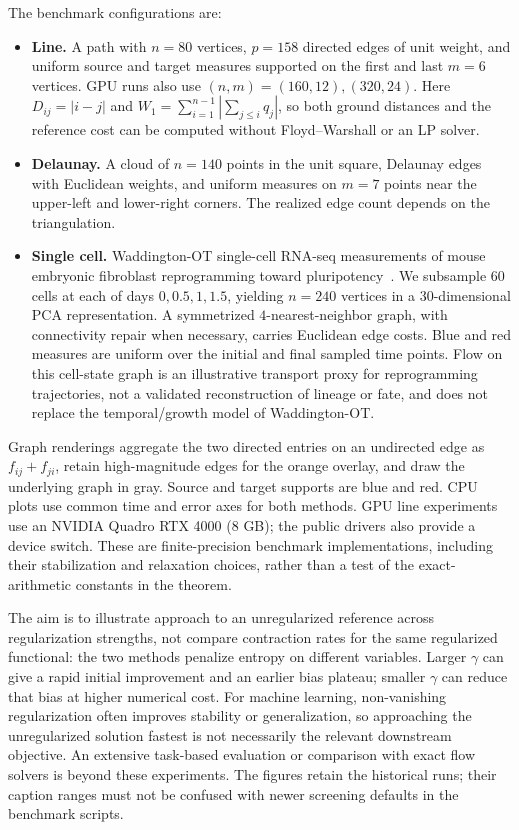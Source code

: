 The benchmark configurations are:
\begin{itemize}[leftmargin=1.2em,itemsep=2pt,topsep=3pt,parsep=0pt]
\item \textbf{Line.} A path with $n=80$ vertices, $p=158$ directed edges of unit weight, and uniform source and target measures supported on the first and last $m=6$ vertices. GPU runs also use $(n,m)=(160,12),(320,24)$. Here $D_{ij}=|i-j|$ and $W_1=\sum_{i=1}^{n-1}|\sum_{j\leq i}q_j|$, so both ground distances and the reference cost can be computed without Floyd--Warshall or an LP solver.
\item \textbf{Delaunay.} A cloud of $n=140$ points in the unit square, Delaunay edges with Euclidean weights, and uniform measures on $m=7$ points near the upper-left and lower-right corners. The realized edge count depends on the triangulation.
\item \textbf{Single cell.} Waddington-OT single-cell RNA-seq measurements of mouse embryonic fibroblast reprogramming toward pluripotency~\citep{schiebinger2019optimal}. We subsample $60$ cells at each of days $0,0.5,1,1.5$, yielding $n=240$ vertices in a $30$-dimensional PCA representation. A symmetrized $4$-nearest-neighbor graph, with connectivity repair when necessary, carries Euclidean edge costs. Blue and red measures are uniform over the initial and final sampled time points. Flow on this cell-state graph is an illustrative transport proxy for reprogramming trajectories, not a validated reconstruction of lineage or fate, and does not replace the temporal/growth model of Waddington-OT.
\end{itemize}
Graph renderings aggregate the two directed entries on an undirected edge as $f_{ij}+f_{ji}$, retain high-magnitude edges for the orange overlay, and draw the underlying graph in gray. Source and target supports are blue and red. CPU plots use common time and error axes for both methods. GPU line experiments use an NVIDIA Quadro RTX 4000 (8 GB); the public drivers also provide a device switch. These are finite-precision benchmark implementations, including their stabilization and relaxation choices, rather than a test of the exact-arithmetic constants in the theorem.

The aim is to illustrate approach to an unregularized reference across regularization strengths, not compare contraction rates for the same regularized functional: the two methods penalize entropy on different variables. Larger $\gamma$ can give a rapid initial improvement and an earlier bias plateau; smaller $\gamma$ can reduce that bias at higher numerical cost. For machine learning, non-vanishing regularization often improves stability or generalization, so approaching the unregularized solution fastest is not necessarily the relevant downstream objective. An extensive task-based evaluation or comparison with exact flow solvers is beyond these experiments. The figures retain the historical runs; their caption ranges must not be confused with newer screening defaults in the benchmark scripts.

